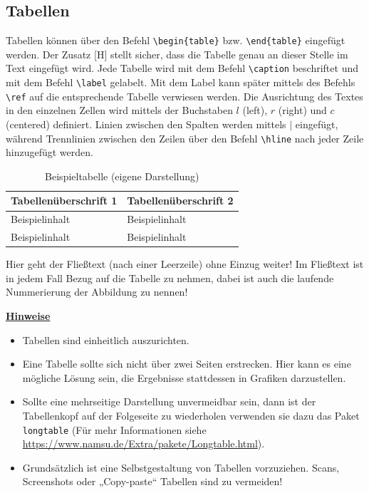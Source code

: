 \subsection{Tabellen}
Tabellen können über den Befehl \verb!\begin{table}! bzw. \verb!\end{table}! eingefügt werden. Der Zusatz [H] stellt sicher, dass die Tabelle genau an dieser Stelle im Text eingefügt wird. Jede Tabelle wird mit dem Befehl \verb!\caption! beschriftet und mit dem Befehl \verb!\label! gelabelt. Mit dem Label kann später mittels des Befehls \verb!\ref! auf die entsprechende Tabelle verwiesen werden. Die Ausrichtung des Textes in den einzelnen Zellen wird mittels der Buchstaben $l$ (left), $r$ (right) und $c$ (centered) definiert. Linien zwischen den Spalten werden mittels $|$ eingefügt, während Trennlinien zwischen den Zeilen über den Befehl \verb!\hline! nach jeder Zeile hinzugefügt werden.

\begin{table}[H]
    \centering
    \caption{Beispieltabelle (eigene Darstellung)}
    \begin{tabular}{|l|l|}
    \hline
        Tabellenüberschrift 1 &  Tabellenüberschrift 2\\
        \hline
         Beispielinhalt & Beispielinhalt\\
         \hline
         Beispielinhalt & Beispielinhalt\\
         \hline
    \end{tabular}
    \label{tab:my_label}
\end{table}
\noindent
Hier geht der Fließtext (nach einer Leerzeile) ohne Einzug weiter! Im Fließtext ist in jedem Fall Bezug auf die Tabelle zu nehmen, dabei ist auch die laufende Nummerierung der Abbildung zu nennen!\\
\newpage

\noindent
\textbf{\uline{Hinweise}}
\begin{itemize}
    \item Tabellen sind einheitlich auszurichten.
    \item Eine Tabelle sollte sich nicht über zwei Seiten erstrecken. Hier kann es eine mögliche Lösung sein, die Ergebnisse stattdessen in Grafiken darzustellen.
    \item Sollte eine mehrseitige Darstellung unvermeidbar sein, dann ist der Tabellenkopf auf der Folgeseite zu wiederholen verwenden sie dazu das Paket \verb!longtable! (Für mehr Informationen siehe \url{https://www.namsu.de/Extra/pakete/Longtable.html}).
    \item Grundsätzlich ist eine Selbstgestaltung von Tabellen vorzuziehen. Scans, Screenshots oder „Copy-paste“ Tabellen sind zu vermeiden! 
\end{itemize}

